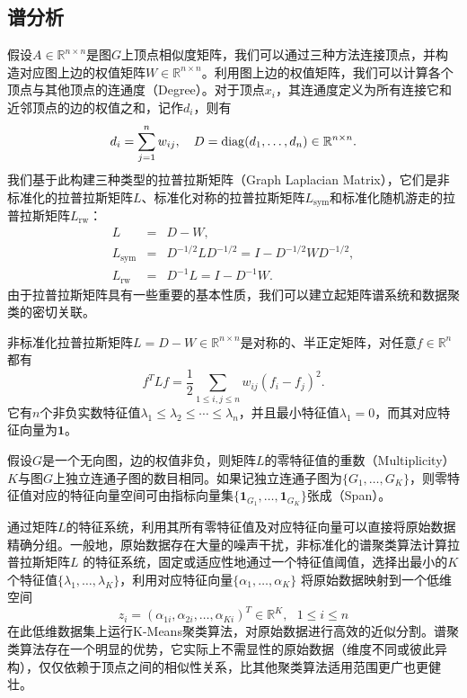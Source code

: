 \subsection{谱分析}
假设$A\in \mathbb R^{n\times n}$是图$G$上顶点相似度矩阵，我们可以通过三种方法连接顶点，并构造对应图上边的权值矩阵$W\in \mathbb R^{n\times n}$。利用图上边的权值矩阵，我们可以计算各个顶点与其他顶点的连通度（Degree）。对于顶点$x_i$，其连通度定义为所有连接它和近邻顶点的边的权值之和，记作$d_i$，则有
\begin{equation}
    d_i = \sum\limits_{j=1}^n w_{ij},~~~D=\operatorname{\mathrm{diag}}(d_1,\ldots,d_n)\in \mathbb R^{n\times n}.
\end{equation}
我们基于此构建三种类型的拉普拉斯矩阵（Graph Laplacian Matrix），它们是非标准化的拉普拉斯矩阵$L$、标准化对称的拉普拉斯矩阵$L_{\text{sym}}$和标准化随机游走的拉普拉斯矩阵$L_{\text{rw}}$：
\begin{eqnarray}
  L &=& D - W,\\
  L_\text{sym} &=& D^{-1/2} L D^{-1/2} = I - D^{-1/2} W D^{-1/2},\\
  L_\text{rw} &=& D^{-1} L = I - D^{-1} W.
\end{eqnarray}
由于拉普拉斯矩阵具有一些重要的基本性质，我们可以建立起矩阵谱系统和数据聚类的密切关联。
\begin{proposition}
非标准化拉普拉斯矩阵$L=D-W\in \mathbb R^{n\times n}$是对称的、半正定矩阵，对任意$f\in \mathbb R^n$都有
\[
    f^T L f = \frac{1}{2} \sum\limits_{1\le i,j\le n} w_{ij} (f_i-f_j)^2.
\]
它有$n$个非负实数特征值$\lambda_1\le \lambda_2 \le \cdots\le \lambda_n$，并且最小特征值$\lambda_1=0$，而其对应特征向量为$\mathbf 1$。
\end{proposition}

\begin{proposition}
假设$G$是一个无向图，边的权值非负，则矩阵$L$的零特征值的重数（Multiplicity）$K$与图$G$上独立连通子图的数目相同。如果记独立连通子图为$\{G_1,\ldots,G_K\}$，则零特征值对应的特征向量空间可由指标向量集$\{\mathbf 1_{G_1},\ldots,\mathbf 1_{G_K}\}$张成（Span）。
\end{proposition}
通过矩阵$L$的特征系统，利用其所有零特征值及对应特征向量可以直接将原始数据精确分组。一般地，原始数据存在大量的噪声干扰，非标准化的谱聚类算法计算拉普拉斯矩阵$L$ 的特征系统，固定或适应性地通过一个特征值阈值，选择出最小的$K$个特征值$\{\lambda_1,\ldots,\lambda_K\}$，利用对应特征向量$\{\alpha_1, \ldots, \alpha_K\}$ 将原始数据映射到一个低维空间
\[
    z_i = (\alpha_{1i}, \alpha_{2i}, \ldots, \alpha_{Ki})^T \in \mathbb R^K,~~~1\le i\le n
\]
在此低维数据集上运行K-Means聚类算法，对原始数据进行高效的近似分割。谱聚类算法存在一个明显的优势，它实际上不需显性的原始数据（维度不同或彼此异构），仅仅依赖于顶点之间的相似性关系，比其他聚类算法适用范围更广也更健壮。

